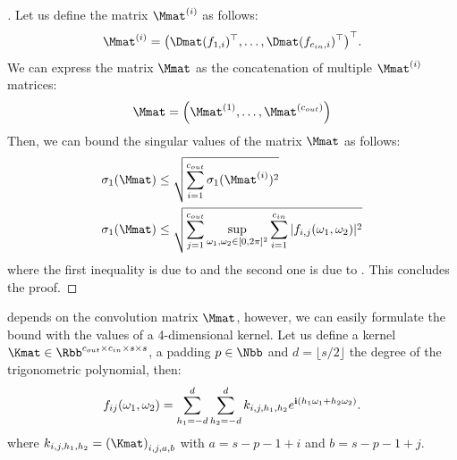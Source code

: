 \begin{proof}[]
  Let us define the matrix $\Mmat^{(i)}$ as follows:
\begin{equation}
  \Mmat^{(i)} = \leftmat \Dmat(f_{1, i})^\top, \dots, \Dmat(f_{\cin, i})^\top \rightmat^\top .
\end{equation}
We can express the matrix $\Mmat$ as the concatenation of multiple $\Mmat^{(i)}$ matrices:
\begin{equation}
  \Mmat = \leftmat \Mmat^{(1)}, \dots, \Mmat^{(\cout)} \rightmat
\end{equation}
Then, we can bound the singular values of the matrix $\Mmat$ as follows:
\begin{align}
  \sigma_1\left(\Mmat\right) &\leq \sqrt{\sum_{i=1}^{\cout} \sigma_1(\Mmat^{(i)})^2} \\
  \sigma_1\left(\Mmat\right) &\leq \sqrt{\sum_{j=1}^{\cout} \sup_{\omega_1, \omega_2 \in [0, 2\pi]^2} \sum_{i=1}^{\cin} |f_{i,j}(\omega_1, \omega_2)|^2 }
\end{align}
where the first inequality is due to  and the second one is due to .
This concludes the proof.
\end{proof}

\endgroup


 depends on the convolution matrix $\Mmat$, however, we can easily formulate the bound with the values of a 4-dimensional kernel.
Let us define a kernel $\Kmat \in \Rbb^{\cout \times \cin \times s \times s}$, a padding $p \in \Nbb$ and $d = \lfloor s / 2 \rfloor$ the degree of the trigonometric polynomial, then:
\begin{equation}
  f_{ij}(\omega_1, \omega_2) = \sum_{h_1 = -d}^d \sum_{h_2 = -d}^d k_{i, j, h_1,h_2} e^{\mathbf{i} (h_1 \omega_1 + h_2 \omega_2)}.
\end{equation}
where $k_{i, j, h_1,h_2} = \leftmat \Kmat \rightmat_{i, j, a, b}$ with $a =  s - p - 1 + i$ and $b =  s - p - 1 + j$.

